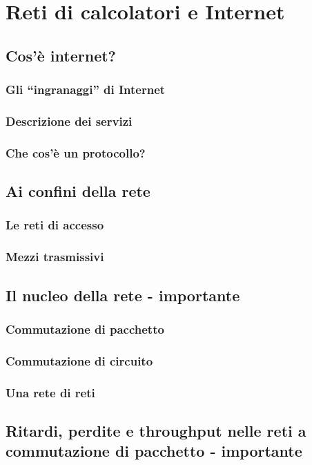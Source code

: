 \section{Reti di calcolatori e Internet}

\subsection{Cos'è internet?}
\subsubsection{Gli “ingranaggi” di Internet}
\subsubsection{Descrizione dei servizi}
\subsubsection{Che cos’è un protocollo?}

\subsection{Ai confini della rete}
\subsubsection{Le reti di accesso}
\subsubsection{Mezzi trasmissivi}

\subsection{Il nucleo della rete - importante}
\subsubsection{Commutazione di pacchetto}
\subsubsection{Commutazione di circuito}
\subsubsection{Una rete di reti}

\subsection{Ritardi, perdite e throughput nelle reti a commutazione di pacchetto - importante}
